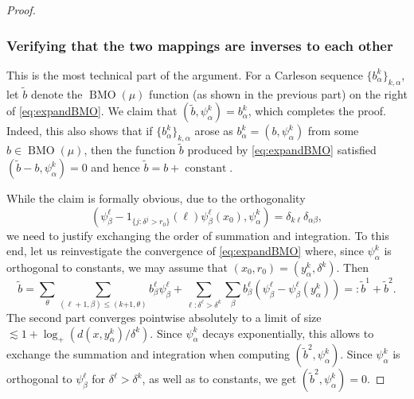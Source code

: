 \documentclass{amsart}
\numberwithin{equation}{section}
\theoremstyle{plain}
\theoremstyle{definition}
\theoremstyle{remark}
\begin{document}
{{{\begin{proof}
\subsubsection*{Verifying that the two mappings are inverses to each other}
This is the most technical part of the argument. For a Carleson sequence $\{b^k_\alpha\}_{k,\alpha}$, let $\tilde{b}$ denote the ${\operatorname{BMO}}(\mu)$ function (as shown in the previous part) on the right of \eqref{eq:expandBMO}. We claim that $(\tilde{b},\psi^k_\alpha)=b^k_\alpha$, which completes the proof. Indeed, this also shows that if $\{b^k_\alpha\}_{k,\alpha}$ arose as $b^k_\alpha=(b,\psi^k_\alpha)$ from some $b\in{\operatorname{BMO}}(\mu)$, then the function $\tilde{b}$ produced by \eqref{eq:expandBMO} satisfied $(\tilde{b}-b,\psi^k_\alpha)=0$ and hence $\tilde{b}=b+\operatorname{constant}$.

While the claim is formally obvious, due to the orthogonality
\begin{equation*}
 (\psi^\ell_\beta-1_{\{j:\delta^j>r_0\}}({\ell})\psi^\ell_\beta(x_0),\psi^k_\alpha)=\delta_{k\ell}\delta_{\alpha\beta},
\end{equation*}
we need to justify exchanging the order of summation and integration. To this end, let us reinvestigate the convergence of \eqref{eq:expandBMO} where, since $\psi^k_\alpha$ is orthogonal to constants, we may assume that $(x_0,r_0)=(y^k_\alpha,\delta^k)$. Then
\begin{equation*}
  \tilde{b}=\sum_{\theta}\sum_{(\ell+1,\beta)\leq(k{+1},\theta)}b^{\ell}_\beta\psi^\ell_\beta
  +\sum_{\ell:\delta^{\ell}>\delta^k}\sum_\beta b^{\ell}_\beta(\psi^\ell_\beta-\psi^\ell_\beta(y^k_\alpha))=:\tilde{b}^1+\tilde{b}^2.
\end{equation*}
The second part converges pointwise absolutely to a limit of size $\lesssim 1+\log_+ (d(x,y^k_\alpha)/\delta^k)$. Since $\psi^k_\alpha$ decays exponentially, this allows to exchange the summation and integration when computing $(\tilde{b}^2,\psi^k_\alpha)$. Since $\psi^k_\alpha$ is orthogonal to $\psi^{\ell}_\beta$ for $\delta^{\ell}>\delta^k$, as well as to constants, we get $(\tilde{b}^2,\psi^k_\alpha)=0$.


\end{proof}}}}
\end{document}
